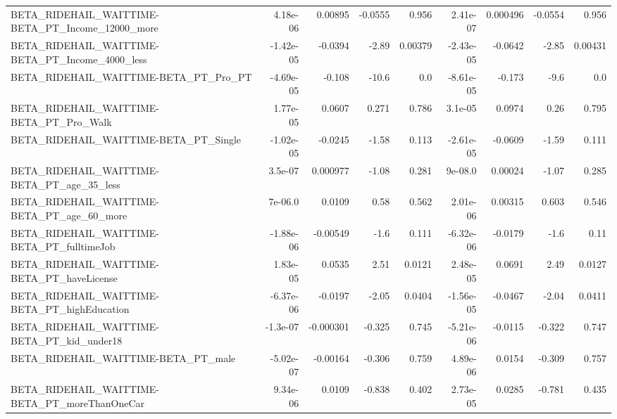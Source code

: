 \begin{tabular}{lrrrrrrrr}
BETA\_RIDEHAIL\_WAITTIME-BETA\_PT\_Income\_12000\_more   &    4.18e-06 &      0.00895 &   -0.0555 &    0.956 &   2.41e-07 &    0.000496 &      -0.0554 &         0.956 \\
BETA\_RIDEHAIL\_WAITTIME-BETA\_PT\_Income\_4000\_less    &   -1.42e-05 &      -0.0394 &     -2.89 &  0.00379 &  -2.43e-05 &     -0.0642 &        -2.85 &       0.00431 \\
BETA\_RIDEHAIL\_WAITTIME-BETA\_PT\_Pro\_PT              &   -4.69e-05 &       -0.108 &     -10.6 &      0.0 &  -8.61e-05 &      -0.173 &         -9.6 &           0.0 \\
BETA\_RIDEHAIL\_WAITTIME-BETA\_PT\_Pro\_Walk            &    1.77e-05 &       0.0607 &     0.271 &    0.786 &    3.1e-05 &      0.0974 &         0.26 &         0.795 \\
BETA\_RIDEHAIL\_WAITTIME-BETA\_PT\_Single              &   -1.02e-05 &      -0.0245 &     -1.58 &    0.113 &  -2.61e-05 &     -0.0609 &        -1.59 &         0.111 \\
BETA\_RIDEHAIL\_WAITTIME-BETA\_PT\_age\_35\_less         &     3.5e-07 &     0.000977 &     -1.08 &    0.281 &    9e-08.0 &     0.00024 &        -1.07 &         0.285 \\
BETA\_RIDEHAIL\_WAITTIME-BETA\_PT\_age\_60\_more         &     7e-06.0 &       0.0109 &      0.58 &    0.562 &   2.01e-06 &     0.00315 &        0.603 &         0.546 \\
BETA\_RIDEHAIL\_WAITTIME-BETA\_PT\_fulltimeJob         &   -1.88e-06 &     -0.00549 &      -1.6 &    0.111 &  -6.32e-06 &     -0.0179 &         -1.6 &          0.11 \\
BETA\_RIDEHAIL\_WAITTIME-BETA\_PT\_haveLicense         &    1.83e-05 &       0.0535 &      2.51 &   0.0121 &   2.48e-05 &      0.0691 &         2.49 &        0.0127 \\
BETA\_RIDEHAIL\_WAITTIME-BETA\_PT\_highEducation       &   -6.37e-06 &      -0.0197 &     -2.05 &   0.0404 &  -1.56e-05 &     -0.0467 &        -2.04 &        0.0411 \\
BETA\_RIDEHAIL\_WAITTIME-BETA\_PT\_kid\_under18         &    -1.3e-07 &    -0.000301 &    -0.325 &    0.745 &  -5.21e-06 &     -0.0115 &       -0.322 &         0.747 \\
BETA\_RIDEHAIL\_WAITTIME-BETA\_PT\_male                &   -5.02e-07 &     -0.00164 &    -0.306 &    0.759 &   4.89e-06 &      0.0154 &       -0.309 &         0.757 \\
BETA\_RIDEHAIL\_WAITTIME-BETA\_PT\_moreThanOneCar      &    9.34e-06 &       0.0109 &    -0.838 &    0.402 &   2.73e-05 &      0.0285 &       -0.781 &         0.435 \\

\end{tabular}
